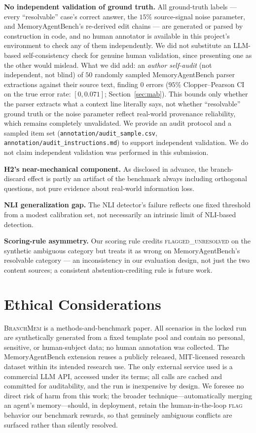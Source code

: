 \documentclass[11pt]{article}
\begin{document}
\noindent\textbf{No independent validation of ground truth.} All ground-truth
labels --- every ``resolvable'' case's correct answer, the $15\%$
source-signal noise parameter, and MemoryAgentBench's re-derived edit
chains --- are generated or parsed by construction in code, and no human
annotator is available in this project's environment to check any of them
independently. We did not substitute an LLM-based self-consistency check for
genuine human validation, since presenting one as the other would mislead.
What we did add: an \emph{author self-audit}
(not independent, not blind) of $50$ randomly sampled MemoryAgentBench
parser extractions against their source text, finding $0$ errors
($95\%$ Clopper--Pearson CI on the true error rate: $[0,0.071]$;
Section~\ref{sec:mab}). This bounds only whether the parser extracts what a
context line literally says, not whether ``resolvable'' ground truth or the
noise parameter reflect real-world provenance reliability, which remains
completely unvalidated. We provide an audit protocol and a sampled item set
(\texttt{annotation/audit\_sample.csv}, \texttt{annotation/audit\_instructions.md})
to support independent validation. We do not claim independent validation
was performed in this submission.

\noindent\textbf{H2's near-mechanical component.} As disclosed in advance, the
branch-discard effect is partly an artifact of the benchmark always including
orthogonal questions, not pure evidence about real-world information loss.

\noindent\textbf{NLI generalization gap.} The NLI detector's failure reflects
one fixed threshold from a modest calibration set, not necessarily an
intrinsic limit of NLI-based detection.

\noindent\textbf{Scoring-rule asymmetry.} Our scoring rule credits
\textsc{flagged\_unresolved} on the synthetic ambiguous category but treats it
as wrong on MemoryAgentBench's resolvable category --- an inconsistency in our
evaluation design, not just the two content sources; a consistent
abstention-crediting rule is future work.

\section*{Ethical Considerations}

\textsc{BranchMem} is a methods-and-benchmark paper. All scenarios in the locked
run are synthetically generated from a fixed template pool and contain no personal,
sensitive, or human-subject data; no human annotation was collected. The
MemoryAgentBench extension reuses a publicly released, MIT-licensed research
dataset within its intended research use. The only external service used is a
commercial LLM API, accessed under its terms; all calls are cached and committed
for auditability, and the run is inexpensive by design. We foresee no direct risk
of harm from this work; the broader technique---automatically merging an agent's
memory---should, in deployment, retain the human-in-the-loop \textsc{flag}
behavior our benchmark rewards, so that genuinely ambiguous conflicts are surfaced
rather than silently resolved.
\end{document}

